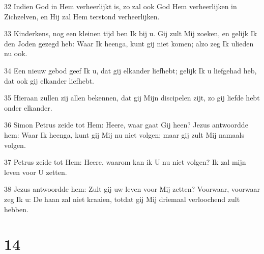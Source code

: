 \par 32 Indien God in Hem verheerlijkt is, zo zal ook God Hem verheerlijken in Zichzelven, en Hij zal Hem terstond verheerlijken.
\par 33 Kinderkens, nog een kleinen tijd ben Ik bij u. Gij zult Mij zoeken, en gelijk Ik den Joden gezegd heb: Waar Ik heenga, kunt gij niet komen; alzo zeg Ik ulieden nu ook.
\par 34 Een nieuw gebod geef Ik u, dat gij elkander liefhebt; gelijk Ik u liefgehad heb, dat ook gij elkander liefhebt.
\par 35 Hieraan zullen zij allen bekennen, dat gij Mijn discipelen zijt, zo gij liefde hebt onder elkander.
\par 36 Simon Petrus zeide tot Hem: Heere, waar gaat Gij heen? Jezus antwoordde hem: Waar Ik heenga, kunt gij Mij nu niet volgen; maar gij zult Mij namaals volgen.
\par 37 Petrus zeide tot Hem: Heere, waarom kan ik U nu niet volgen? Ik zal mijn leven voor U zetten.
\par 38 Jezus antwoordde hem: Zult gij uw leven voor Mij zetten? Voorwaar, voorwaar zeg Ik u: De haan zal niet kraaien, totdat gij Mij driemaal verloochend zult hebben.

\chapter{14}

